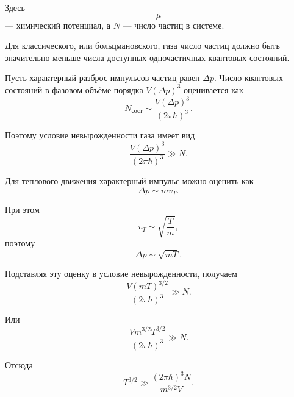 \documentclass[../final.tex]{subfiles}
\begin{document}
Здесь
%
\begin{equation*}
    \mu
\end{equation*}
%
--- химический потенциал, а $N$ --- число частиц в системе.




Для классического, или больцмановского, газа число частиц
должно быть значительно меньше числа доступных одночастичных
квантовых состояний.

Пусть характерный разброс импульсов частиц равен $\Delta p$.
Число квантовых состояний в фазовом объёме порядка
$V(\Delta p)^3$ оценивается как
%
\begin{equation*}
    N_{\text{сост}}
    \sim
    \frac{
        V(\Delta p)^3
    }{
        (2\pi\hbar)^3
    }.
\end{equation*}

Поэтому условие невырожденности газа имеет вид
%
\begin{equation*}
    \frac{
        V(\Delta p)^3
    }{
        (2\pi\hbar)^3
    }
    \gg
    N.
\end{equation*}

Для теплового движения характерный импульс можно оценить как
%
\begin{equation*}
    \Delta p
    \sim
    mv_T.
\end{equation*}

При этом
%
\begin{equation*}
    v_T
    \sim
    \sqrt{\frac{T}{m}},
\end{equation*}
%
поэтому
%
\begin{equation*}
    \Delta p
    \sim
    \sqrt{mT}.
\end{equation*}

Подставляя эту оценку в условие невырожденности, получаем
%
\begin{equation*}
    \frac{
        V(mT)^{3/2}
    }{
        (2\pi\hbar)^3
    }
    \gg
    N.
\end{equation*}

Или
%
\begin{equation*}
    \frac{
        V m^{3/2}T^{3/2}
    }{
        (2\pi\hbar)^3
    }
    \gg
    N.
\end{equation*}

Отсюда
%
\begin{equation*}
    T^{3/2}
    \gg
    \frac{
        (2\pi\hbar)^3N
    }{
        m^{3/2}V
    }.
\end{equation*}
\end{document}
